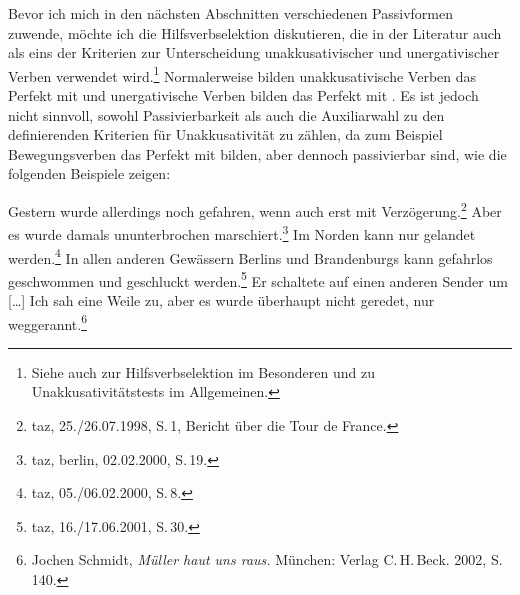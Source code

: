 

Bevor ich mich in den nächsten Abschnitten verschiedenen Passivformen zuwende,
möchte ich die Hilfsverbselektion diskutieren, die in der Literatur auch als
eins der Kriterien zur Unterscheidung unakkusativischer und unergativischer Verben verwendet
wird.\footnote{
  Siehe auch  zur Hilfsverbselektion im Besonderen und
  zu Unakkusativitätstests im Allgemeinen.
}
Normalerweise bilden unakkusativische Verben das Perfekt mit \seinp
und unergativische Verben bilden das Perfekt mit \habenp. Es ist jedoch nicht sinnvoll,
sowohl Passivierbarkeit als auch die Auxiliarwahl zu den definierenden Kriterien für
Unakkusativität zu zählen, da zum Beispiel Bewegungsverben
das Perfekt mit \sein bilden, aber dennoch passivierbar sind, wie die folgenden Beispiele zeigen:
\begin{sloppypar}
\eal
\ex{}
Gestern wurde allerdings noch gefahren, wenn auch erst mit Verzögerung.\footnote{
        taz, 25./26.07.1998, S.\,1, Bericht über die Tour de France.%
}
\ex{}
Aber es wurde damals ununterbrochen marschiert.\footnote{
        taz, berlin, 02.02.2000, S.\,19.%
}
\ex{}
Im Norden kann nur gelandet werden.\footnote{
         taz, 05./06.02.2000, S.\,8.%
}
\ex{}
In allen anderen Gewässern Berlins und Brandenburgs kann gefahrlos geschwommen und geschluckt werden.\footnote{
         taz, 16./17.06.2001, S.\,30.%
}
\ex Er schaltete auf einen anderen Sender um [\ldots] Ich sah eine Weile
zu, aber es wurde überhaupt nicht geredet, nur weggerannt.\footnote{
        Jochen Schmidt, \emph{Müller haut uns raus.} München: Verlag C.\,H.\,Beck. 2002, S.\,140.%
}
\zl
\end{sloppypar}


